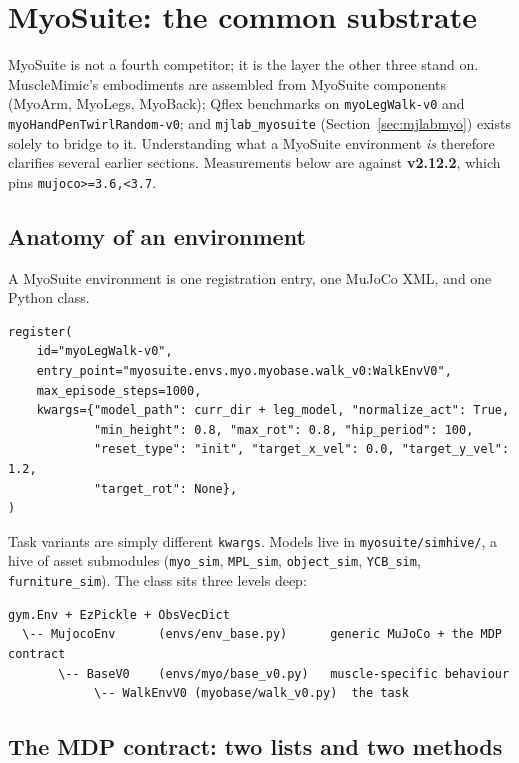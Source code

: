 \documentclass[11pt,a4paper]{article}
\begin{document}
\section{MyoSuite: the common substrate}
\label{sec:myosuite}

MyoSuite is not a fourth competitor; it is the layer the other three stand on. MuscleMimic's
embodiments are assembled from MyoSuite components (MyoArm, MyoLegs, MyoBack); Qflex
benchmarks on \texttt{myoLegWalk-v0} and \texttt{myoHandPenTwirlRandom-v0}; and
\texttt{mjlab\_myosuite} (Section~\ref{sec:mjlabmyo}) exists solely to bridge to it.
Understanding what a MyoSuite environment \emph{is} therefore clarifies several earlier
sections. Measurements below are against \textbf{v2.12.2}, which pins
\texttt{mujoco>=3.6,<3.7}.

\subsection{Anatomy of an environment}

A MyoSuite environment is one registration entry, one MuJoCo XML, and one Python class.

\begin{lstlisting}
register(
    id="myoLegWalk-v0",
    entry_point="myosuite.envs.myo.myobase.walk_v0:WalkEnvV0",
    max_episode_steps=1000,
    kwargs={"model_path": curr_dir + leg_model, "normalize_act": True,
            "min_height": 0.8, "max_rot": 0.8, "hip_period": 100,
            "reset_type": "init", "target_x_vel": 0.0, "target_y_vel": 1.2,
            "target_rot": None},
)
\end{lstlisting}

\noindent
Task variants are simply different \texttt{kwargs}. Models live in
\texttt{myosuite/simhive/}, a hive of asset submodules (\texttt{myo\_sim},
\texttt{MPL\_sim}, \texttt{object\_sim}, \texttt{YCB\_sim},
\texttt{furniture\_sim}). The class sits three levels deep:

\begin{lstlisting}
gym.Env + EzPickle + ObsVecDict
  \-- MujocoEnv      (envs/env_base.py)      generic MuJoCo + the MDP contract
       \-- BaseV0    (envs/myo/base_v0.py)   muscle-specific behaviour
            \-- WalkEnvV0 (myobase/walk_v0.py)  the task
\end{lstlisting}

\subsection{The MDP contract: two lists and two methods}
\end{document}
